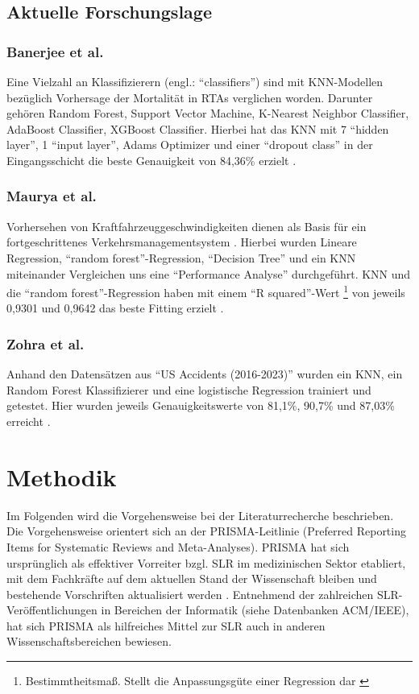 \documentclass{scrartcl}
\begin{document}
\subsection{Aktuelle Forschungslage}

\subsubsection{Banerjee et al.}
Eine Vielzahl an Klassifizierern (engl.: \enquote{classifiers}) sind mit
KNN-Modellen bezüglich Vorhersage der Mortalität in RTAs verglichen worden.
Darunter gehören
Random Forest, Support Vector Machine, K-Nearest Neighbor Classifier,
AdaBoost Classifier, XGBoost Classifier. Hierbei hat das KNN mit 7
\enquote{hidden layer}, 1 \enquote{input layer}, Adams Optimizer und einer
\enquote{dropout class} in der Eingangsschicht die beste Genauigkeit von 84,36\%
erzielt \cite{akt1}.

\subsubsection{Maurya et al.}
Vorhersehen von Kraftfahrzeuggeschwindigkeiten dienen als Basis für ein
fortgeschrittenes Verkehrsmanagementsystem \cite{akt2}. Hierbei wurden
Lineare Regression, \enquote{random forest}-Regression, \enquote{Decision Tree} und
ein KNN miteinander Vergleichen uns eine \enquote{Performance Analyse} durchgeführt.
KNN und die \enquote{random forest}-Regression haben mit einem
\enquote{R squared}-Wert \footnote{Bestimmtheitsmaß.
   Stellt die Anpassungsgüte einer Regression dar \cite{rsquared}}
von jeweils 0,9301 und 0,9642 das beste Fitting erzielt \cite{akt2}.

\subsubsection{Zohra et al.}
Anhand den Datensätzen aus \enquote{US Accidents (2016-2023)} wurden ein KNN,
ein Random Forest Klassifizierer und eine logistische Regression trainiert und
getestet. Hier wurden jeweils Genauigkeitswerte von 81,1\%, 90,7\% und 87,03\%
erreicht \cite{akt3}.


\section{Methodik}
Im Folgenden wird die Vorgehensweise bei der Literaturrecherche beschrieben.
Die Vorgehensweise orientert sich an der PRISMA-Leitlinie (Preferred Reporting
Items for Systematic Reviews and Meta-Analyses). PRISMA hat sich ursprünglich
als effektiver Vorreiter bzgl. SLR im medizinischen Sektor etabliert, mit dem
Fachkräfte auf dem aktuellen Stand der Wissenschaft bleiben und bestehende
Vorschriften aktualisiert werden \cite{prisma}. Entnehmend der zahlreichen
SLR-Veröffentlichungen in Bereichen der Informatik (siehe Datenbanken ACM/IEEE),
hat sich PRISMA als hilfreiches Mittel zur SLR auch in anderen
Wissenschaftsbereichen bewiesen.
\end{document}
